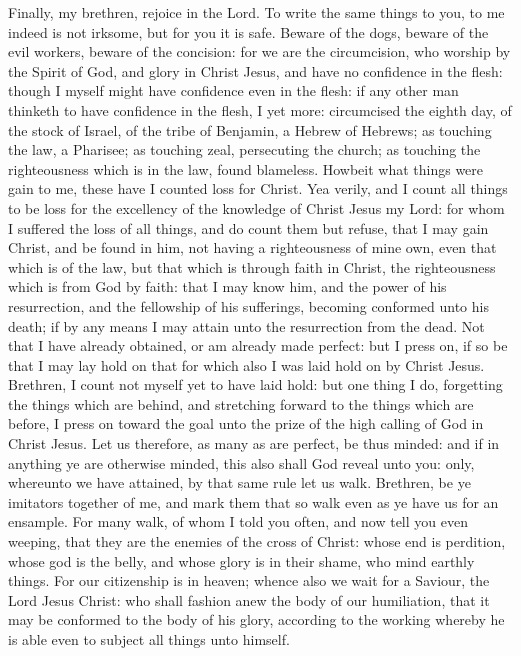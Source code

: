 Finally, my brethren, rejoice in the Lord. To write the same things to you, to me indeed is not irksome, but for you it is safe. Beware of the dogs, beware of the evil workers, beware of the concision: for we are the circumcision, who worship by the Spirit of God, and glory in Christ Jesus, and have no confidence in the flesh: though I myself might have confidence even in the flesh: if any other man thinketh to have confidence in the flesh, I yet more: circumcised the eighth day, of the stock of Israel, of the tribe of Benjamin, a Hebrew of Hebrews; as touching the law, a Pharisee; as touching zeal, persecuting the church; as touching the righteousness which is in the law, found blameless. Howbeit what things were gain to me, these have I counted loss for Christ. Yea verily, and I count all things to be loss for the excellency of the knowledge of Christ Jesus my Lord: for whom I suffered the loss of all things, and do count them but refuse, that I may gain Christ, and be found in him, not having a righteousness of mine own, even that which is of the law, but that which is through faith in Christ, the righteousness which is from God by faith: that I may know him, and the power of his resurrection, and the fellowship of his sufferings, becoming conformed unto his death; if by any means I may attain unto the resurrection from the dead. Not that I have already obtained, or am already made perfect: but I press on, if so be that I may lay hold on that for which also I was laid hold on by Christ Jesus. Brethren, I count not myself yet to have laid hold: but one thing I do, forgetting the things which are behind, and stretching forward to the things which are before, I press on toward the goal unto the prize of the high calling of God in Christ Jesus. Let us therefore, as many as are perfect, be thus minded: and if in anything ye are otherwise minded, this also shall God reveal unto you: only, whereunto we have attained, by that same rule let us walk.  Brethren, be ye imitators together of me, and mark them that so walk even as ye have us for an ensample. For many walk, of whom I told you often, and now tell you even weeping, that they are the enemies of the cross of Christ: whose end is perdition, whose god is the belly, and whose glory is in their shame, who mind earthly things. For our citizenship is in heaven; whence also we wait for a Saviour, the Lord Jesus Christ: who shall fashion anew the body of our humiliation, that it may be conformed to the body of his glory, according to the working whereby he is able even to subject all things unto himself. 

